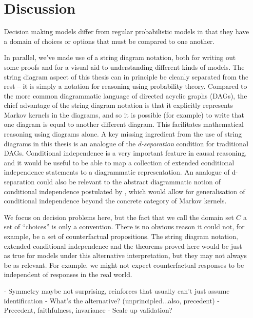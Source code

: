 

\chapter{Discussion}\label{ch:discussion}

Decision making models differ from regular probabilistic models in that they have a domain of choices or options that must be compared to one another. 

In parallel, we've made use of a string diagram notation, both for writing out some proofs and for a visual aid to understanding different kinds of models. The string diagram aspect of this thesis can in principle be cleanly separated from the rest -- it is simply a notation for reasoning using probability theory. Compared to the more common diagrammatic language of directed acyclic graphs (DAGs), the chief advantage of the string diagram notation is that it explicitly represents Markov kernels in the diagrams, and so it is possible (for example) to write that one diagram is equal to another different diagram. This facilitates mathematical reasoning using diagrams alone. A key missing ingredient from the use of string diagrams in this thesis is an analogue of the \emph{d-separation} condition for traditional DAGs. Conditional independence is a very important feature in causal reasoning, and it would be useful to be able to map a collection of extended conditional independence statements to a diagrammatic representation. An analogue of d-separation could also be relevant to the abstract diagrammatic notion of conditional independence postulated by \citet{fritz_synthetic_2020}, which would allow for generalisation of conditional independence beyond the concrete category of Markov kernels.

We focus on decision problems here, but the fact that we call the domain set $C$ a set of ``choices'' is only a convention. There is no obvious reason it could not, for example, be a set of counterfactual propositions. The string diagram notation, extended conditional independence and the theorems proved here would be just as true for models under this alternative interpretation, but they may not always be as relevant. For example, we might not expect counterfactual responses to be independent of responses in the real world.

 - Symmetry maybe not surprising, reinforces that usually can't just assume identification
 - What's the alternative? (unprincipled...also, precedent)
 - Precedent, faithfulness, invariance
 - Scale up validation?